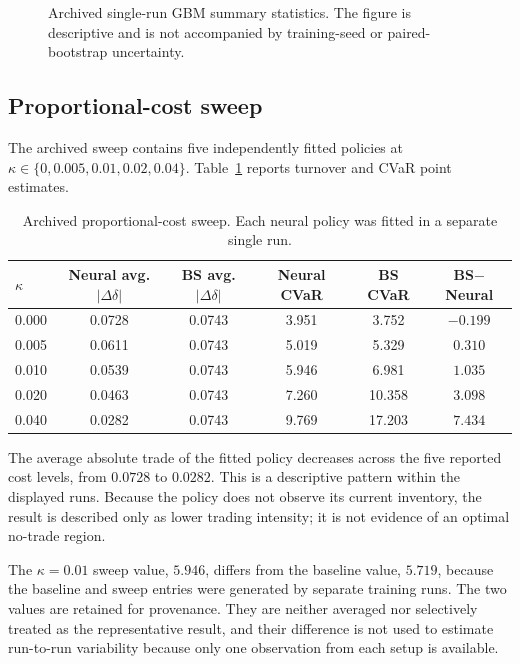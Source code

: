 \begin{figure}[htbp]
\centering
{}
\caption{Archived single-run GBM summary statistics. The figure is descriptive
and is not accompanied by training-seed or paired-bootstrap uncertainty.}
\label{fig:baseline}
\end{figure}

\subsection{Proportional-cost sweep}

The archived sweep contains five independently fitted policies at
$\kappa\in\{0,0.005,0.01,0.02,0.04\}$. Table~\ref{tab:kappa} reports turnover
and CVaR point estimates.

\begin{table}[htbp]
\centering
\caption{Archived proportional-cost sweep. Each neural policy was fitted in a
separate single run.}
\label{tab:kappa}
\begin{tabular}{lccccc}
\toprule
$\kappa$
& Neural avg. $|\Delta\delta|$
& BS avg. $|\Delta\delta|$
& Neural CVaR
& BS CVaR
& BS$-$Neural \\
\midrule
0.000 & 0.0728 & 0.0743 & 3.951 & 3.752 & $-0.199$ \\
0.005 & 0.0611 & 0.0743 & 5.019 & 5.329 & $0.310$ \\
0.010 & 0.0539 & 0.0743 & 5.946 & 6.981 & $1.035$ \\
0.020 & 0.0463 & 0.0743 & 7.260 & 10.358 & $3.098$ \\
0.040 & 0.0282 & 0.0743 & 9.769 & 17.203 & $7.434$ \\
\bottomrule
\end{tabular}
\end{table}

The average absolute trade of the fitted policy decreases across the five
reported cost levels, from $0.0728$ to $0.0282$. This is a descriptive pattern
within the displayed runs. Because the policy does not observe its current
inventory, the result is described only as lower trading intensity; it is not
evidence of an optimal no-trade region.

The $\kappa=0.01$ sweep value, $5.946$, differs from the baseline value,
$5.719$, because the baseline and sweep entries were generated by separate
training runs. The two values are retained for provenance. They are neither
averaged nor selectively treated as the representative result, and their
difference is not used to estimate run-to-run variability because only one
observation from each setup is available.

